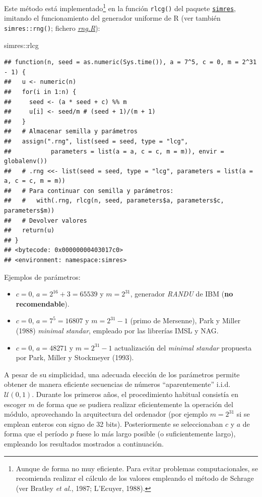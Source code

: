 \documentclass[
]{book}
\newenvironment{Shaded}{\begin{snugshade}}{\end{snugshade}}
\newcommand{\NormalTok}[1]{#1}
\newcommand{\SpecialCharTok}[1]{\textcolor[rgb]{0.00,0.00,0.00}{#1}}
\theoremstyle{break}
\theoremstyle{nonumberplain}
\begin{document}
Este método está implementado\footnote{Aunque de forma no muy eficiente. Para evitar problemas computacionales, se recomienda realizar el cálculo de los valores empleando el método de Schrage (ver Bratley \emph{et al.}, 1987; L'Ecuyer, 1988).} en la función \texttt{rlcg()} del paquete \href{https://rubenfcasal.github.io/simres}{\texttt{simres}}, imitando el funcionamiento del generador uniforme de R (ver también \texttt{simres::rng()}; fichero \href{R/rng.R}{\emph{rng.R}}):

\begin{Shaded}
\begin{Highlighting}[]
\NormalTok{simres}\SpecialCharTok{::}\NormalTok{rlcg}
\end{Highlighting}
\end{Shaded}

\begin{verbatim}
## function(n, seed = as.numeric(Sys.time()), a = 7^5, c = 0, m = 2^31 - 1) {
##   u <- numeric(n)
##   for(i in 1:n) {
##     seed <- (a * seed + c) %% m
##     u[i] <- seed/m # (seed + 1)/(m + 1)
##   }
##   # Almacenar semilla y parámetros
##   assign(".rng", list(seed = seed, type = "lcg",
##           parameters = list(a = a, c = c, m = m)), envir = globalenv())
##   # .rng <<- list(seed = seed, type = "lcg", parameters = list(a = a, c = c, m = m))
##   # Para continuar con semilla y parámetros:
##   #   with(.rng, rlcg(n, seed, parameters$a, parameters$c, parameters$m))
##   # Devolver valores
##   return(u)
## }
## <bytecode: 0x00000000403017c0>
## <environment: namespace:simres>
\end{verbatim}

Ejemplos de parámetros:

\begin{itemize}
\item
  \(c=0\), \(a=2^{16}+3=65539\) y \(m=2^{31}\), generador \emph{RANDU} de IBM
  (\textbf{no recomendable}).
\item
  \(c=0\), \(a=7^{5}=16807\) y \(m=2^{31}-1\) (primo de Mersenne), Park y Miller (1988)
  \emph{minimal standar}, empleado por las librerías IMSL y NAG.
\item
  \(c=0\), \(a=48271\) y \(m=2^{31}-1\) actualización del \emph{minimal standar}
  propuesta por Park, Miller y Stockmeyer (1993).
\end{itemize}

A pesar de su simplicidad, una adecuada elección de los parámetros permite obtener de manera eficiente secuencias de números ``aparentemente'' i.i.d. \(\mathcal{U}(0,1)\).
Durante los primeros años, el procedimiento habitual consistía en escoger \(m\) de forma que se pudiera realizar eficientemente la operación del módulo, aprovechando la arquitectura del ordenador (por ejemplo \(m = 2^{31}\) si se emplean enteros con signo de 32 bits).
Posteriormente se seleccionaban \(c\) y \(a\) de forma que el período \(p\) fuese lo más largo posible (o suficientemente largo), empleando los resultados mostrados a continuación.
\end{document}
